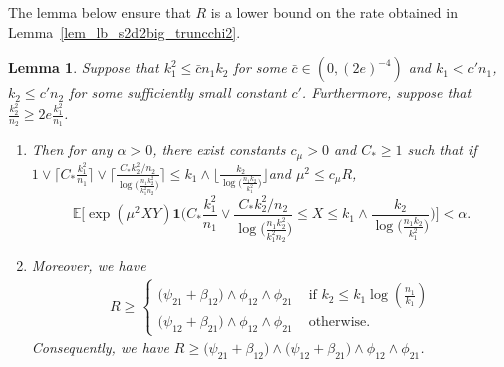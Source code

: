 \documentclass{article}
\newcommand{\EE}{\mathbb{E}}
\newcommand{\one}{\mathbf{1}}
\newcommand{\Ct}{C_{*}}
\newtheorem{lemma}{Lemma}
\begin{document}
The lemma below ensure that $R$ is a lower bound on the rate obtained in Lemma~\ref{lem_lb_s2d2big_truncchi2}.
\begin{lemma}\label{lem_simplify_s2d2big_truncchi2}
Suppose that $k_1^2 \leq \bar{c}n_1k_2$ for some $\bar{c} \in (0, (2e)^{-4})$ and $k_1 < c' n_1$, $k_2 \leq c' n_2$ for some sufficiently small constant $c'$. 
    Furthermore, suppose that $\frac{k^2_2}{n_2} \geq 2e\frac{k_1^2}{n_1}$. 
    \begin{enumerate}
        \item Then for any $\alpha > 0$, there exist constants $c_\mu > 0$ and $C_* \geq 1$ such that if $1 \vee \big\lceil \Ct \frac{k_1^2}{n_1}\big\rceil \vee \Big\lceil \frac{\Ct k_2^2/n_2}{\log\big(\frac{n_1k_2^2}{k_1^2n_2}\big)}\Big\rceil \leq k_1\wedge\big\lfloor\frac{k_2}{\log\big(\frac{n_1k_2}{k_1^2}\big)}\big\rfloor$and $\mu^2 \leq c_\mu R$, 
    \[\EE\Big[\exp(\mu^2XY)\one\Big( \Ct \frac{k_1^2}{n_1} \vee \frac{\Ct k_2^2/n_2}{\log\big(\frac{n_1k_2^2}{k_1^2n_2}\big)} \leq X \leq k_1\wedge\frac{k_2}{\log\big(\frac{n_1k_2}{k_1^2}\big)}\Big)\Big] < \alpha.\]
    \item Moreover, we have
    \begin{align*}
        R \geq \begin{cases}
            \big(\psi_{21} + \beta_{12}\big)\land \phi_{12} \land \phi_{21} & \text{ if } k_2 \leq k_1 \log\left(\frac{n_1}{k_1}\right)\\
            \big(\psi_{12} + \beta_{21}\big)\land \phi_{12} \land \phi_{21} & \text{ otherwise. } 
        \end{cases}
    \end{align*}
    Consequently, we have $R \geq \big(\psi_{21} + \beta_{12}\big) \land \big(\psi_{12} + \beta_{21}\big) \land \phi_{12} \land \phi_{21}$.
    \end{enumerate}
    
\end{lemma}
\end{document}
